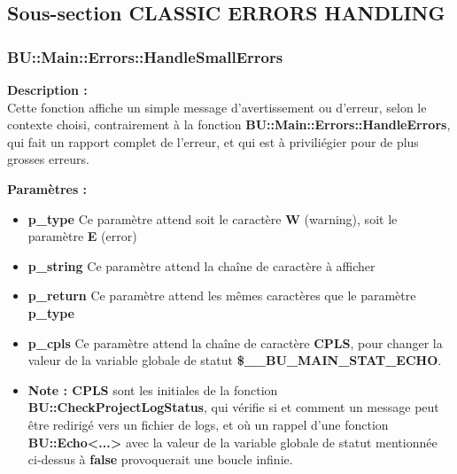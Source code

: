 \documentclass[a4paper,10pt]{article}
\begin{document}
\color{green}
\subsection{Sous-section CLASSIC ERRORS HANDLING}\color{white}

\color{blue}
\subsubsection{BU::Main::Errors::HandleSmallErrors}\color{white}

\begin{justify}
    \textbf{Description :}\\
    Cette fonction affiche un simple message d'avertissement ou d'erreur, selon le contexte choisi, contrairement à la fonction \textbf{\color{mauve}BU::Main::Errors::HandleErrors}, qui fait un rapport complet de l'erreur, et qui est à priviliégier pour de plus grosses erreurs.
\end{justify}

\begin{justify}
    \textbf{Paramètres :}

    \begin{itemize}
        \item \textbf{\color{orange}p\_type} Ce paramètre attend soit le caractère \textbf{W} (warning), soit le paramètre \textbf{E} (error)\\

        \item \textbf{\color{orange}p\_string} Ce paramètre attend la chaîne de caractère à afficher\\

        \item \textbf{\color{orange}p\_return} Ce paramètre attend les mêmes caractères que le paramètre \textbf{\color{orange}p\_type}\\

        \item \textbf{\color{orange}p\_cpls} Ce paramètre attend la chaîne de caractère \textbf{CPLS}, pour changer la valeur de la variable globale de statut \textbf{\color{orange}\$\_\_BU\_MAIN\_STAT\_ECHO}.\\
        
        \item \textbf{Note : CPLS} sont les initiales de la fonction \textbf{\color{mauve}BU::CheckProjectLogStatus}, qui vérifie si et comment un message peut être redirigé vers un fichier de logs, et où un rappel d'une fonction \textbf{\color{mauve}BU::Echo<...>} avec la valeur de la variable globale de statut mentionnée ci-dessus à \textbf{false} provoquerait une boucle infinie.
    \end{itemize}
\end{justify}
\end{document}
